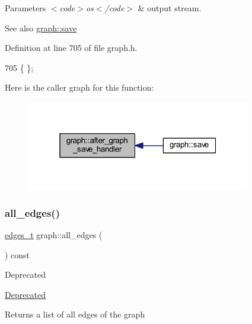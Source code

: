 \begin{DoxyParams}{Parameters}
{\em $<$code$>$os$<$/code$>$} & output stream. \\
\hline
\end{DoxyParams}
\begin{DoxySeeAlso}{See also}
\mbox{\hyperlink{classgraph_a7bd0712a528249d1585085a64ac3e661}{graph\+::save}} 
\end{DoxySeeAlso}


Definition at line 705 of file graph.\+h.


\begin{DoxyCode}
705 \{ \};
\end{DoxyCode}
Here is the caller graph for this function\+:
\nopagebreak
\begin{figure}[H]
\begin{center}
\leavevmode
\includegraphics[width=277pt]{classgraph_af0c7aba21d57d827ae96cae632441651_icgraph}
\end{center}
\end{figure}
\mbox{\label{classgraph_aa0c7027e0cc7430b77ab9629eecefd3f}} 
\subsubsection{\texorpdfstring{all\+\_\+edges()}{all\_edges()}}
{\footnotesize\ttfamily \mbox{\hyperlink{edge_8h_a8f9587479bda6cf612c103494b3858e3}{edges\+\_\+t}} graph\+::all\+\_\+edges (\begin{DoxyParamCaption}{ }\end{DoxyParamCaption}) const}

\begin{DoxyRefDesc}{Deprecated}
\item[\mbox{\hyperlink{deprecated__deprecated000004}{Deprecated}}]\end{DoxyRefDesc}
\begin{DoxyReturn}{Returns}
a list of all edges of the graph 
\end{DoxyReturn}


